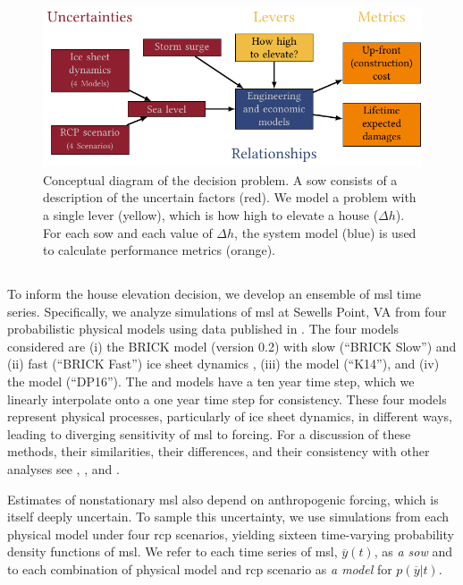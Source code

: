 \documentclass[12pt]{article}
\begin{document}
\begin{figure}
    \centering
    \includegraphics[width=\textwidth]{xlrm.pdf}
    \caption{
        Conceptual diagram of the decision problem.
        A \gls{sow} consists of a description of the uncertain factors (red).
        We model a problem with a single lever (yellow), which is how high to elevate a house ($\Delta h$).
        For each \acrshort{sow} and each value of $\Delta h$, the system model (blue) is used to calculate performance metrics (orange).
    }\label{fig:xlrm}
\end{figure}

\subsection{}\label{sec:sea-level}

To inform the house elevation decision, we develop an ensemble of \gls{msl} time series.
Specifically, we analyze simulations of \gls{msl} at Sewells Point, VA from four probabilistic physical models using data published in \citet{ruckert_coastal:2019}.
The four models considered are (i) the BRICK model (version 0.2) with slow (``BRICK Slow'') and (ii) fast (``BRICK Fast'') ice sheet dynamics \citep{wong_brick0.2:2017}, (iii) the \citet{kopp_probabilistic:2014} model (``K14''), and (iv) the \citet{deconto_antarctica:2016} model (``DP16'').
The \citet{kopp_probabilistic:2014} and \citet{deconto_antarctica:2016} models have a ten year time step, which we linearly interpolate onto a one year time step for consistency.
These four models represent physical processes, particularly of ice sheet dynamics, in different ways, leading to diverging sensitivity of \gls{msl} to forcing.
For a discussion of these methods, their similarities, their differences, and their consistency with other analyses see \citet{ruckert_coastal:2019}, \citet{kopp_evolving:2017}, and \citet{bamber_slrise:2019}.

Estimates of nonstationary \gls{msl} also depend on anthropogenic forcing, which is itself deeply uncertain.
To sample this uncertainty, we use simulations from each physical model under four \gls{rcp} scenarios, yielding sixteen time-varying probability density functions of \gls{msl}.
We refer to each time series of \gls{msl}, $\overline{y}(t)$, as \emph{a \acrfull{sow}} and to each combination of physical model and \gls{rcp} scenario as \emph{a model} for $p(\overline{y}|t)$.
\end{document}
